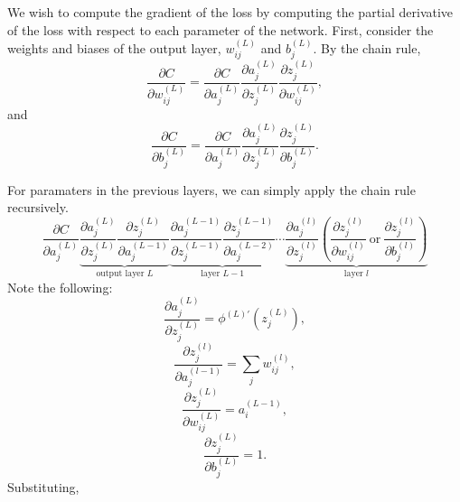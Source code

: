 \documentclass[12pt]{report}
\theoremstyle{definition}
\theoremstyle{remark}
\begin{document}
We wish to compute the gradient of the loss by computing the partial derivative of the loss with respect to each parameter of the network. First, consider the weights and biases of the output layer, $w_{ij}^{(L)}$ and $b_j^{(L)}$. By the chain rule,
\begin{equation}\label{eq:chain-rule-weights}
    \frac{\partial C}{\partial w_{ij}^{(L)}} = \frac{\partial C}{\partial a_j^{(L)}} \frac{\partial a_j^{(L)}}{\partial z_j^{(L)}} \frac{\partial z_j^{(L)}}{\partial w_{ij}^{(L)}},
\end{equation}
and
\begin{equation}\label{eq:chain-rule-biases}
    \frac{\partial C}{\partial b_j^{(L)}} = \frac{\partial C}{\partial a_j^{(L)}} \frac{\partial a_j^{(L)}}{\partial z_j^{(L)}} \frac{\partial z_j^{(L)}}{\partial b_j^{(L)}}.
\end{equation}

For paramaters in the previous layers, we can simply apply the chain rule recursively.
\begin{equation}\label{eq:big-chain}
    \frac{\partial C}{\partial a_j^{(L)}} \underbrace{\frac{\partial a_j^{(L)}}{\partial z_j^{(L)}} \frac{\partial z_j^{(L)}}{\partial a_j^{(L-1)}}}_{\text{output layer $L$}} \underbrace{\frac{\partial a_j^{(L-1)}}{\partial z_j^{(L-1)}} \frac{\partial z_j^{(L-1)}}{\partial a_{j}^{(L-2)}}}_{\text{layer $L-1$}} \cdots \underbrace{\frac{\partial a_j^{(l)}}{\partial z_j^{(l)}} \left(\frac{\partial z_j^{(l)}}{\partial w_{ij}^{(l)}} \ \text{or} \ \frac{\partial z_j^{(l)}}{\partial b_j^{(l)}}\right)}_{\text{layer $l$}}
\end{equation}
Note the following:
\begin{equation}\label{eq:partial-z-partial-a}
    \frac{\partial a_j^{(L)}}{\partial z_j^{(L)}} = \phi^{(L)\prime}(z_j^{(L)}),
\end{equation}
\begin{equation}
    \frac{\partial z_j^{(l)}}{\partial a_{j}^{(l-1)}} = \sum_j w_{ij}^{(l)},
\end{equation}
\begin{equation}
    \frac{\partial z_j^{(L)}}{\partial w_{ij}^{(L)}} = a_i^{(L-1)},
\end{equation}
\begin{equation}
    \frac{\partial z_j^{(L)}}{\partial b_j^{(L)}} = 1.
\end{equation}
Substituting,
\end{document}
